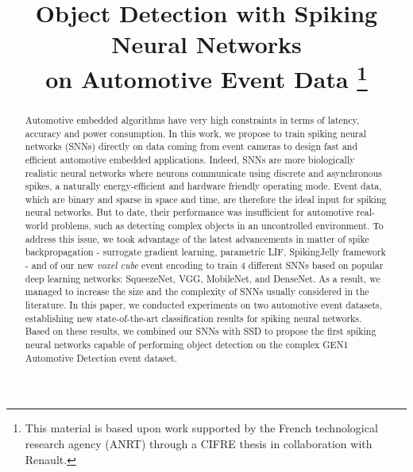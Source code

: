 \documentclass[conference]{IEEEtran}
\begin{document}
\title{Object Detection with Spiking Neural Networks \\ on Automotive Event Data
\thanks{This material is based upon work supported by the French technological research agency (ANRT) through a CIFRE thesis in collaboration with Renault.}
}

\author{
\and
{}
\and
{}
}



\maketitle

\begin{abstract}
Automotive embedded algorithms have very high constraints in terms of latency, accuracy and power consumption. In this work, we propose to train spiking neural networks (SNNs) directly on data coming from event cameras to design fast and efficient automotive embedded applications. Indeed, SNNs are more biologically realistic neural networks where neurons communicate using discrete and asynchronous spikes, a naturally energy-efficient and hardware friendly operating mode. Event data, which are binary and sparse in space and time, are therefore the ideal input for spiking neural networks. But to date, their performance was insufficient for automotive real-world problems, such as detecting complex objects in an uncontrolled environment. To address this issue, we took advantage of the latest advancements in matter of spike backpropagation - surrogate gradient learning, parametric LIF, SpikingJelly framework - and of our new \textit{voxel cube} event encoding to train 4 different SNNs based on popular deep learning networks: SqueezeNet, VGG, MobileNet, and DenseNet. As a result, we managed to increase the size and the complexity of SNNs usually considered in the literature. In this paper, we conducted experiments on two automotive event datasets, establishing new state-of-the-art classification results for spiking neural networks. Based on these results, we combined our SNNs with SSD to propose the first spiking neural networks capable of performing object detection on the complex GEN1 Automotive Detection event dataset. 

\end{abstract}
\end{document}
